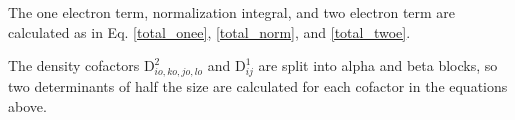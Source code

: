 \documentclass[a4paper]{article}
\begin{document}
The one electron term, normalization integral, and two electron term are calculated as in Eq. \ref{total_onee}, \ref{total_norm}, and \ref{total_twoe}. 

The density cofactors $\text{D}_{io,ko,jo,lo}^2$ and $\text{D}_{ij}^1$ are split into alpha and beta blocks, so two determinants of half the size are calculated for each cofactor in the equations above.
 

\end{document}
